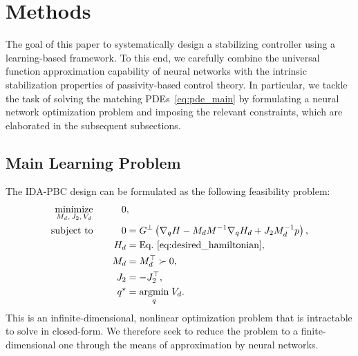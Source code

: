 \section{Methods}
\label{sec:methods}

The goal of this paper to systematically design a stabilizing controller using a
learning-based framework. To this end, we carefully combine the universal function
approximation capability of neural networks with the intrinsic stabilization
properties of passivity-based control theory. In particular, we tackle the task
of solving the matching PDEs~\eqref{eq:pde_main} by formulating a neural network
optimization problem and imposing the relevant constraints, which are elaborated in
the subsequent subsections.


\subsection{Main Learning Problem}
\label{ssec:pinn}


The IDA-PBC design can be formulated as the following feasibility problem:
%
\begin{equation}
    \begin{aligned}
        \underset{M_d,\, J_2,\, V_d }{\textrm{minimize}} && 0 &, \\
        \textrm{subject to} 
        &&\quad 0 &= G^\perp \left( \nabla_qH - M_dM^{-1} \nabla_qH_d + J_2M_d^{-1}p \right), \\
        &&\quad H_d &= \textrm{Eq.~\eqref{eq:desired_hamiltonian}}, \\
        &&\quad M_d &= M_d^\top \succ 0, \\
        &&\quad J_2 &= -J_2^\top, \\
        &&\quad q^\star &= \underset{q}{\textrm{argmin}} \; V_d.  \\
    \end{aligned}    
    \label{eq:infinite_optim}
\end{equation}
%
This is an infinite-dimensional, nonlinear optimization problem that is
intractable to solve in closed-form. We therefore seek to reduce the problem to
a finite-dimensional one through the means of approximation by neural networks.

